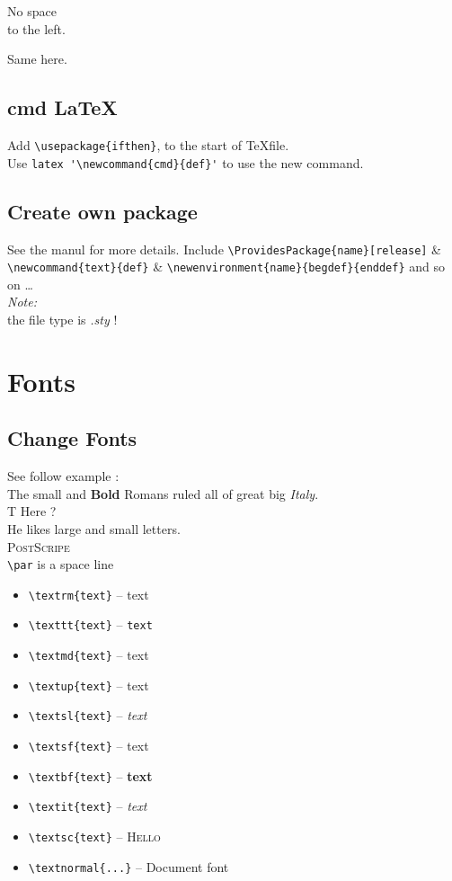 \documentclass[a4paper,12pt,titlepage]{article}
\begin{document}
\newenvironment{correct}{\noindent\ignorespaces}{\par\noindent\ignorespacesafterend}

\begin{correct}
No space \\ to the left.
\end{correct}
Same here.

\subsection{cmd \LaTeX}
Add \verb|\usepackage{ifthen}|, to the start of \TeX file.\\
Use \verb|latex '\newcommand{cmd}{def}'| to use the new command.\\

\subsection{Create own package}
See the manul for more details.
Include \verb|\ProvidesPackage{name}[release]| \& \verb|\newcommand{text}{def}| \&
\verb|\newenvironment{name}{begdef}{enddef}| and so on \ldots \\

\noindent\emph{Note:} \\
the file type is \emph{.sty} !

\section{Fonts}
\subsection{Change Fonts}
See follow example :\\
{\small The small and \textbf{Bold}} Romans ruled
{\Large all of great big \textit{Italy}. }\\
T Here ?\\
He likes {\LARGE large and {\small small} letters}.\\
\textsc{PostScripe}\\
\verb|\par| is a space line \\

\begin{itemize}
\item \verb|\textrm{text}| -- \textrm{text}
\item \verb|\texttt{text}| -- \texttt{text}
\item \verb|\textmd{text}| -- \textmd{text}
\item \verb|\textup{text}| -- \textup{text}
\item \verb|\textsl{text}| -- \textsl{text}
\item \verb|\textsf{text}| -- \textsf{text}
\item \verb|\textbf{text}| -- \textbf{text}
\item \verb|\textit{text}| -- \textit{text}
\item \verb|\textsc{text}| -- \textsc{Hello}
\item \verb|\textnormal{...}| -- \textnormal{Document font}
\end{itemize}
\end{document}
